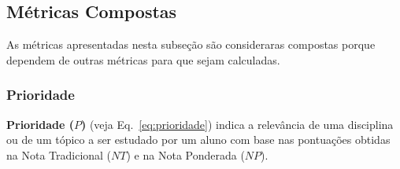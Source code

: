 \subsection{Métricas Compostas}
As métricas apresentadas nesta subseção são consideraras compostas porque dependem de outras métricas para que sejam calculadas. 

%
%
%
%

\subsubsection{Prioridade}
\label{sec:prioridade}

\textbf{Prioridade ($P$)} (veja Eq.~\ref{eq:prioridade}) indica a relevância de uma disciplina ou de um tópico a ser estudado por um aluno com base nas pontuações obtidas na Nota Tradicional ($NT$) e na Nota Ponderada ($NP$).

